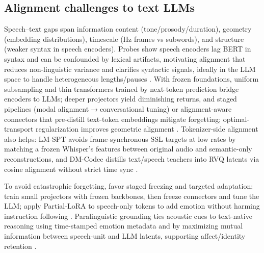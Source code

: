\documentclass{article}
\begin{document}
\subsection{Alignment challenges to text LLMs} \label{subsec:Alignment challenges to text LLMs}
Speech--text gaps span information content (tone/prosody/duration), geometry (embedding distributions), timescale (Hz frames vs subwords), and structure (weaker syntax in speech encoders). Probes show speech encoders lag BERT in syntax and can be confounded by lexical artifacts, motivating alignment that reduces non-linguistic variance and clarifies syntactic signals, ideally in the LLM space to handle heterogeneous lengths/pauses \cite{shen2023wavesyntaxprobingspokenlanguagemodels,xu2025optimaltransportregularizationspeechtext}. With frozen foundations, uniform subsampling and thin transformers trained by next-token prediction bridge encoders to LLMs; deeper projectors yield diminishing returns, and staged pipelines (modal alignment$\rightarrow$conversational tuning) or alignment-aware connectors that pre-distill text-token embeddings mitigate forgetting; optimal-transport regularization improves geometric alignment \cite{wang2023slmbridgethingapbetweenspeechtextfoundat,shu2023llasmlargelanguagespeechmodel,tan2025ssralignmentawaremodalityconnectorspeech,xu2025optimaltransportregularizationspeechtext}. Tokenizer-side alignment also helps: LM-SPT avoids frame-synchronous SSL targets at low rates by matching a frozen Whisper's features between original audio and semantic-only reconstructions, and DM-Codec distills text/speech teachers into RVQ latents via cosine alignment without strict time sync \cite{jo2025lmsptalignedsemanticdistillationspeechto,ahasan2025dmcodecdistillingmultimodalrepresentatio}.

To avoid catastrophic forgetting, favor staged freezing and targeted adaptation: train small projectors with frozen backbones, then freeze connectors and tune the LLM; apply Partial-LoRA to speech-only tokens to add emotion without harming instruction following \cite{wang2023slmbridgethingapbetweenspeechtextfoundat,tan2025ssralignmentawaremodalityconnectorspeech,wang2024blspemotowardsempatheticlargespeechlangu}. Paralinguistic grounding ties acoustic cues to text-native reasoning using time-stamped emotion metadata and by maximizing mutual information between speech-unit and LLM latents, supporting affect/identity retention \cite{wang2025incorporatingcontextualparalinguisticund,wang2025bossbeyondsemanticspeech}.
\end{document}

